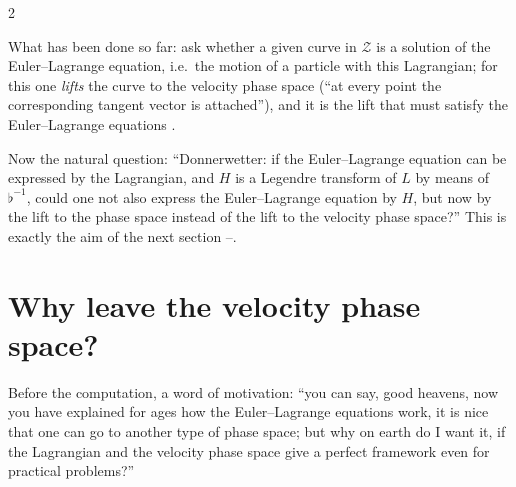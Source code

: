 \begin{paracol}{2}
\begin{example}
What has been done so far: ask whether a given curve in $\mathcal Z$ is a solution of the Euler--Lagrange equation, i.e.\ the motion of a particle with this Lagrangian; for this one \emph{lifts} the curve to the velocity phase space (``at every point the corresponding tangent vector is attached''), and it is the lift that must satisfy the Euler--Lagrange equations .
\end{example}
Now the natural question: ``Donnerwetter: if the Euler--Lagrange equation can be expressed by the Lagrangian, and $H$ is a Legendre transform of $L$ by means of $\flat^{-1}$, could one not also express the Euler--Lagrange equation by $H$, but now by the lift to the phase space instead of the lift to the velocity phase space?'' This is exactly the aim of the next section --.

\section{Why leave the velocity phase space?}\label{sec:hq-why}

Before the computation, a word of motivation: ``you can say, good heavens, now you have explained for ages how the Euler--Lagrange equations work, it is nice that one can go to another type of phase space; but why on earth do I want it, if the Lagrangian and the velocity phase space give a perfect framework even for practical problems?'' 


\end{paracol}
